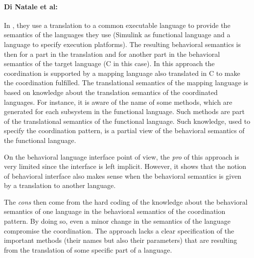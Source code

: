 

\paragraph{Di Natale et al: }
In \cite{dinatale}, they use a translation to a common executable language to provide the semantics of the languages they use (Simulink as functional language and a language to specify execution platforms). The resulting behavioral semantics is then for a part in the translation and for another part in the behavioral semantics of the target language (C in this case). In this approach the coordination is supported by a mapping language also translated in C to make the coordination fulfilled. 
The translational semantics of the mapping language is based on knowledge about the translation semantics of the coordinated languages. For instance, it is aware of the name of some methods, which are generated for each subsystem in the functional language. Such methods are part of the translational semantics of the functional language. 
Such knowledge, used to specify the coordination pattern, is a partial view of the behavioral semantics of the functional language. 

On the behavioral language interface point of view, the \emph{pro} of this approach is very
limited since the interface is left implicit. However, it shows that the notion of behavioral interface also makes sense when the behavioral semantics is given by a translation to another language.

The \emph{cons} then come from the hard coding of the knowledge about the behavioral semantics of one language in the behavioral semantics of the coordination pattern. By doing so, even a minor change in the semantics of the language compromise the coordination. The approach lacks a clear specification of the important methods (their names but also their parameters) that are resulting from the translation of some specific part of a language.

 
